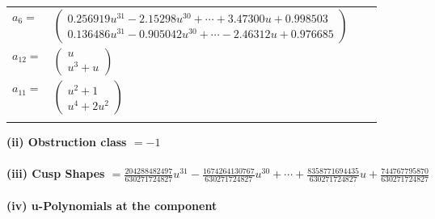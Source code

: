 \documentclass[1p]{elsarticle_modified}
\theoremstyle{definition}
\begin{document}
\begin{tabular}{m{7pt} m{180pt} m{7pt} m{180pt} }
\flushright $a_{6}=$&$\begin{pmatrix}0.256919 u^{31}-2.15298 u^{30}+\cdots+3.47300 u+0.998503\\0.136486 u^{31}-0.905042 u^{30}+\cdots-2.46312 u+0.976685\end{pmatrix}$ \\
\flushright $a_{12}=$&$\begin{pmatrix}u\\u^3+u\end{pmatrix}$ \\
\flushright $a_{11}=$&$\begin{pmatrix}u^2+1\\u^4+2 u^2\end{pmatrix}$\\&\end{tabular}
\flushleft \textbf{(ii) Obstruction class $= -1$}\\~\\
\flushleft \textbf{(iii) Cusp Shapes $= \frac{204288482497}{630271724827} u^{31}-\frac{1674264130767}{630271724827} u^{30}+\cdots+\frac{8358771694435}{630271724827} u+\frac{744767795870}{630271724827}$}\\~\\
\newpage\renewcommand{\arraystretch}{1}
\flushleft \textbf{(iv) u-Polynomials at the component}\newline \\
\end{document}
